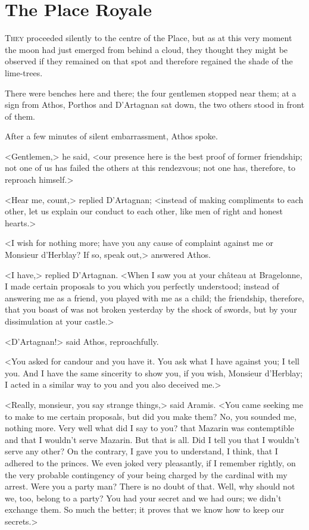 \chapter{The Place Royale}

 \lettrine{T}{hey} proceeded silently to the centre of the Place, but as at this very moment the moon had just emerged from behind a cloud, they thought they might be observed if they remained on that spot and therefore regained the shade of the lime-trees.

There were benches here and there; the four gentlemen stopped near them; at a sign from Athos, Porthos and D'Artagnan sat down, the two others stood in front of them.

After a few minutes of silent embarrassment, Athos spoke.

<Gentlemen,> he said, <our presence here is the best proof of former friendship; not one of us has failed the others at this rendezvous; not one has, therefore, to reproach himself.>

<Hear me, count,> replied D'Artagnan; <instead of making compliments to each other, let us explain our conduct to each other, like men of right and honest hearts.>

<I wish for nothing more; have you any cause of complaint against me or Monsieur d'Herblay? If so, speak out,> answered Athos.

<I have,> replied D'Artagnan. <When I saw you at your château at Bragelonne, I made certain proposals to you which you perfectly understood; instead of answering me as a friend, you played with me as a child; the friendship, therefore, that you boast of was not broken yesterday by the shock of swords, but by your dissimulation at your castle.>

<D'Artagnan!> said Athos, reproachfully.

<You asked for candour and you have it. You ask what I have against you; I tell you. And I have the same sincerity to show you, if you wish, Monsieur d'Herblay; I acted in a similar way to you and you also deceived me.>

<Really, monsieur, you say strange things,> said Aramis. <You came seeking me to make to me certain proposals, but did you make them? No, you sounded me, nothing more. Very well what did I say to you? that Mazarin was contemptible and that I wouldn't serve Mazarin. But that is all. Did I tell you that I wouldn't serve any other? On the contrary, I gave you to understand, I think, that I adhered to the princes. We even joked very pleasantly, if I remember rightly, on the very probable contingency of your being charged by the cardinal with my arrest. Were you a party man? There is no doubt of that. Well, why should not we, too, belong to a party? You had your secret and we had ours; we didn't exchange them. So much the better; it proves that we know how to keep our secrets.>


